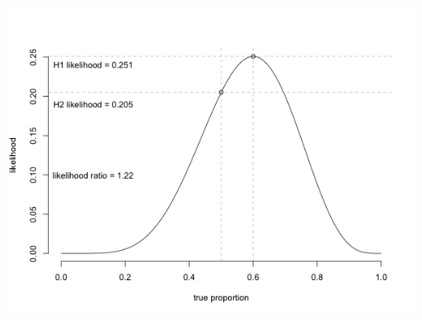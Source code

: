 \documentclass[11pt]{article}
\begin{document}
\includegraphics[width=.9\linewidth]{figures/coinFlip.png}
\end{document}

